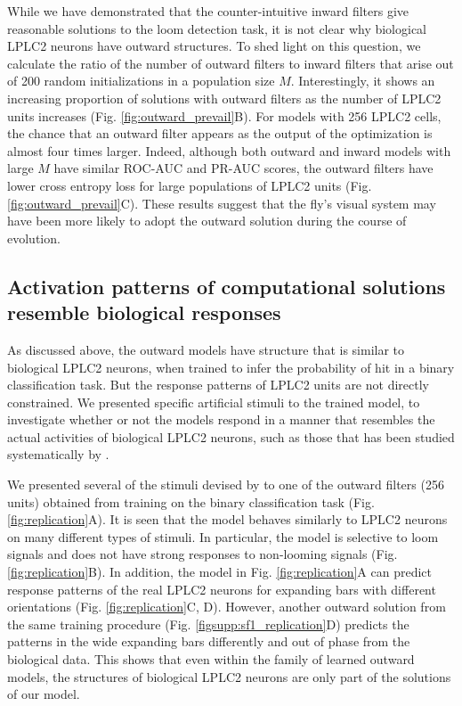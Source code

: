 \documentclass[pdftex,9pt,lineno]{elife}
\begin{document}
While we have demonstrated that the counter-intuitive inward filters give reasonable solutions to the loom detection task, it is not clear why biological LPLC2 neurons have outward structures. To shed light on this question, we calculate the ratio of the number of outward filters to inward filters that arise out of 200 random initializations in a population size $M$. Interestingly, it shows an increasing proportion of solutions with outward filters as the number of LPLC2 units increases (Fig. \ref{fig:outward_prevail}B). For models with 256 LPLC2 cells, the chance that an outward filter appears as the output of the optimization is almost four times larger. Indeed, although both outward and inward models with large $M$ have similar ROC-AUC and PR-AUC scores,  the outward filters have lower cross entropy loss for large populations of LPLC2 units (Fig. \ref{fig:outward_prevail}C). These results suggest that the fly's visual
system may have been more likely to adopt the outward solution during the course of evolution.

\subsection{Activation patterns of computational solutions resemble biological responses}




As discussed above, the outward models have structure that is similar to biological LPLC2 neurons, when trained to infer the probability of hit in a binary classification task. But the response patterns of LPLC2 units are not directly constrained. We presented specific artificial stimuli to the trained model, to investigate whether or not the models respond in a manner that resembles the actual activities of biological LPLC2 neurons, such as those that has been studied systematically by \cite{klapoetke2017ultra}.

We presented several of the stimuli devised by \cite{klapoetke2017ultra} to one of the outward filters (256 units) obtained from training on the binary classification task (Fig. \ref{fig:replication}A). It is seen that the model behaves similarly to LPLC2 neurons on many different types of stimuli. In particular, the model is selective to loom signals and does not have strong responses to non-looming signals (Fig. \ref{fig:replication}B). In addition, the model in Fig. \ref{fig:replication}A can predict response patterns of the real LPLC2 neurons for expanding bars with different orientations (Fig. \ref{fig:replication}C, D). However, another outward solution from the same training procedure (Fig. \ref{figsupp:sf1_replication}D) predicts the patterns in the wide expanding bars differently and out of phase from the biological data. This shows that even within the family of learned outward models, the structures of biological LPLC2 neurons are only part of the solutions of our model.
\end{document}
